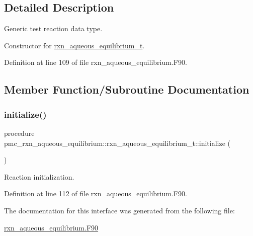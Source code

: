 \subsection{Detailed Description}
Generic test reaction data type. 

Constructor for \mbox{\hyperlink{structpmc__rxn__aqueous__equilibrium_1_1rxn__aqueous__equilibrium__t}{rxn\+\_\+aqueous\+\_\+equilibrium\+\_\+t}}. 

Definition at line 109 of file rxn\+\_\+aqueous\+\_\+equilibrium.\+F90.



\subsection{Member Function/\+Subroutine Documentation}
\mbox{\label{structpmc__rxn__aqueous__equilibrium_1_1rxn__aqueous__equilibrium__t_a103c23f4a3cd48b0228183d817a8d23e}} 
\subsubsection{\texorpdfstring{initialize()}{initialize()}}
{\footnotesize\ttfamily procedure pmc\+\_\+rxn\+\_\+aqueous\+\_\+equilibrium\+::rxn\+\_\+aqueous\+\_\+equilibrium\+\_\+t\+::initialize (\begin{DoxyParamCaption}{ }\end{DoxyParamCaption})\hspace{0.3cm}{\ttfamily [private]}}



Reaction initialization. 



Definition at line 112 of file rxn\+\_\+aqueous\+\_\+equilibrium.\+F90.



The documentation for this interface was generated from the following file\+:\begin{DoxyCompactItemize}
\item 
\mbox{\hyperlink{rxn__aqueous__equilibrium_8_f90}{rxn\+\_\+aqueous\+\_\+equilibrium.\+F90}}\end{DoxyCompactItemize}
